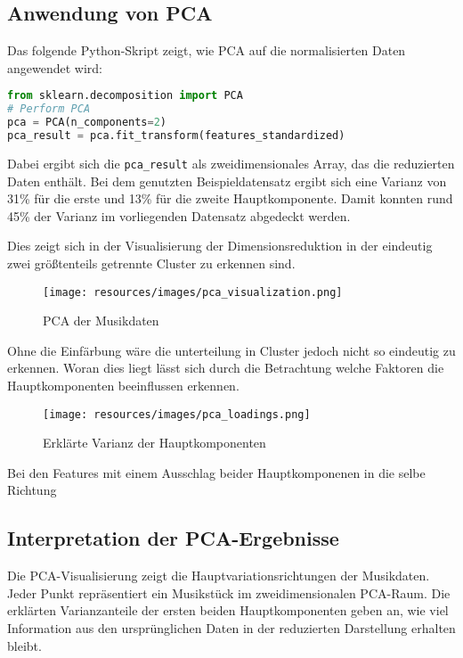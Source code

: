 \subsection{Anwendung von PCA}

Das folgende Python-Skript zeigt, wie PCA auf die normalisierten Daten angewendet wird:

\begin{lstlisting}[language=python, caption={PCA-Analyse der Musikdaten}]
from sklearn.decomposition import PCA
# Perform PCA
pca = PCA(n_components=2)
pca_result = pca.fit_transform(features_standardized)
\end{lstlisting}
Dabei ergibt sich die \texttt{pca\_result} als zweidimensionales Array, das die reduzierten Daten enthält. Bei dem genutzten Beispieldatensatz ergibt sich eine Varianz von 31\% für die erste und 13\% für die zweite Hauptkomponente. Damit konnten rund 45\% der Varianz im vorliegenden Datensatz abgedeckt werden.

Dies zeigt sich in der Visualisierung der Dimensionsreduktion in der eindeutig zwei größtenteils getrennte Cluster zu erkennen sind.
\begin{figure}[H]
    \centering
    \texttt{[image: resources/images/pca\_visualization.png]}
    \caption{PCA der Musikdaten}
\end{figure}

Ohne die Einfärbung wäre die unterteilung in Cluster jedoch nicht so eindeutig zu erkennen. Woran dies liegt lässt sich durch die Betrachtung welche Faktoren die Hauptkomponenten beeinflussen erkennen.
\begin{figure}[H]
    \centering
    \texttt{[image: resources/images/pca\_loadings.png]}
    \caption{Erklärte Varianz der Hauptkomponenten}
\end{figure}
Bei den Features mit einem Ausschlag beider Hauptkomponenen in die selbe Richtung

\subsection{Interpretation der PCA-Ergebnisse}

Die PCA-Visualisierung zeigt die Hauptvariationsrichtungen der Musikdaten. Jeder Punkt repräsentiert ein Musikstück im zweidimensionalen PCA-Raum. Die erklärten Varianzanteile der ersten beiden Hauptkomponenten geben an, wie viel Information aus den ursprünglichen Daten in der reduzierten Darstellung erhalten bleibt.

